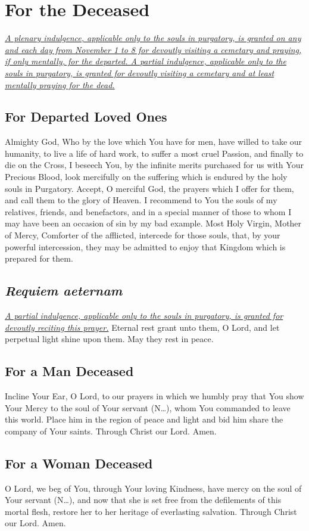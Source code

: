 \documentclass[12pt]{article}
\newcommand{\prayersection}[1]{\section{#1}}
\newcommand{\prayertitle}[1]{\subsection{#1}}
\newcommand{\insertname}{(N\dots)\xspace}
\newcommand{\emphasis}[1]{\emph{#1}}
\newcommand{\emphasis}[1]{\textsl{#1}}
\newcommand{\foreign}[1]{\emphasis{#1}}
\newcommand{\note}[1]{{\small{\emphasis{#1}}}\newline}
\newcommand{\linkednote}[2]{\hyperlink{#1}{\note{#2}}}
\begin{document}
\prayersection{For the Deceased}
\linkednote{grant29}{A plenary indulgence, applicable only to the souls in purgatory, is granted on any and each day from November 1 to 8 for devoutly visiting a cemetary and praying, if only mentally, for the departed.
A partial indulgence, applicable only to the souls in purgatory, is granted for devoutly visiting a cemetary and at least mentally praying for the dead.}
\prayertitle{For Departed Loved Ones}
Almighty God, Who by the love which You have for men, have willed to take our humanity, to live a life of hard work, to suffer a most cruel Passion, and finally to die on the Cross, I beseech You, by the infinite merits purchased for us with Your Precious Blood, look mercifully on the suffering  which is endured by the holy souls in Purgatory. 
Accept, O merciful God, the prayers which I offer for them, and call them to the glory of Heaven. 
I recommend to You the souls of my relatives, friends, and benefactors, and in a special manner of those to whom I may have been an occasion of sin by my bad example. 
Most Holy Virgin, Mother of Mercy, Comforter of the afflicted, intercede for those souls, that, by your powerful intercession, they may be admitted to enjoy that Kingdom which is prepared for them.

\prayertitle{\foreign{Requiem aeternam}}
\linkednote{grant29}{A partial indulgence, applicable only to the souls in purgatory, is granted for devoutly reciting this prayer.}
Eternal rest grant unto them, O Lord, and let perpetual light shine upon them.
May they rest in peace.

\prayertitle{For a Man Deceased}
Incline Your Ear, O Lord, to our prayers in which we humbly pray that You show Your Mercy to the soul of Your servant \insertname, whom You commanded to leave this world.
Place him in the region of peace and light and bid him share the company of Your saints.
Through Christ our Lord. Amen.

\prayertitle{For a Woman Deceased}
O Lord, we beg of You, through Your loving Kindness, have mercy on the soul of Your servant \insertname, and now that she is set free from the defilements of this mortal flesh, restore her to her heritage of everlasting salvation.
Through Christ our Lord. Amen.
\end{document}
